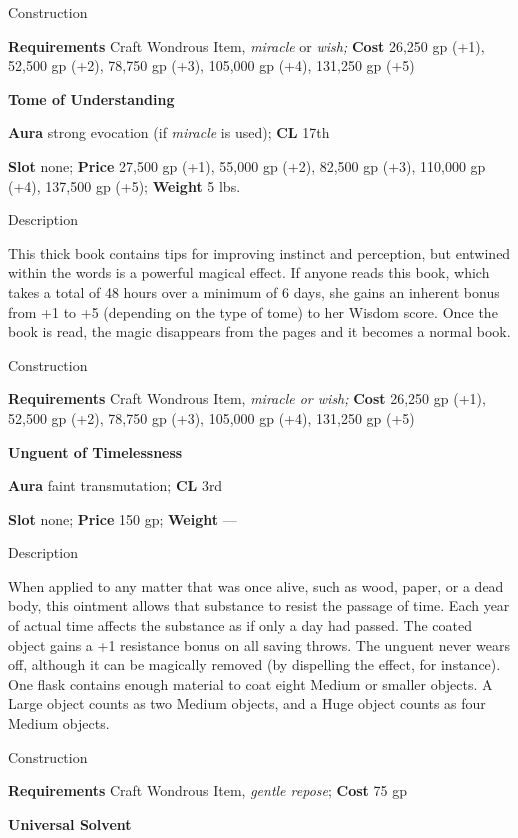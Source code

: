 Construction
				
\textbf{Requirements} Craft Wondrous Item,\textit{ miracle} or\textit{ wish; }\textbf{Cost }26,250 gp (+1), 52,500 gp (+2), 78,750 gp (+3), 105,000 gp (+4), 131,250 gp (+5)
				
\textbf{Tome of Understanding}
				
\textbf{Aura} strong evocation (if \textit{miracle }is used);\textbf{ CL }17th
				
\textbf{Slot} none; \textbf{Price} 27,500 gp (+1), 55,000 gp (+2), 82,500 gp (+3), 110,000 gp (+4), 137,500 gp (+5); \textbf{Weight} 5 lbs.
				
Description
				
This thick book contains tips for improving instinct and perception, but entwined within the words is a powerful magical effect. If anyone reads this book, which takes a total of 48 hours over a minimum of 6 days, she gains an inherent bonus from +1 to +5 (depending on the type of tome) to her Wisdom score. Once the book is read, the magic disappears from the pages and it becomes a normal book. 
				
Construction
				
\textbf{Requirements} Craft Wondrous Item, \textit{miracle or wish; }\textbf{Cost }26,250 gp (+1), 52,500 gp (+2), 78,750 gp (+3), 105,000 gp (+4), 131,250 gp (+5)
				
\textbf{Unguent of Timelessness}
				
\textbf{Aura} faint transmutation;\textbf{ CL }3rd
				
\textbf{Slot} none; \textbf{Price} 150 gp; \textbf{Weight }---
				
Description
				
When applied to any matter that was once alive, such as wood, paper, or a dead body, this ointment allows that substance to resist the passage of time. Each year of actual time affects the substance as if only a day had passed. The coated object gains a +1 resistance bonus on all saving throws. The unguent never wears off, although it can be magically removed (by dispelling the effect, for instance). One flask contains enough material to coat eight Medium or smaller objects. A Large object counts as two Medium objects, and a Huge object counts as four Medium objects. 
				
Construction
				
\textbf{Requirements} Craft Wondrous Item, \textit{gentle repose};\textbf{ Cost }75 gp
				
\textbf{Universal Solvent}
				
